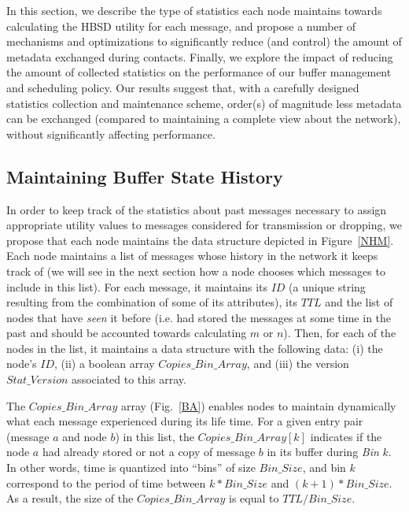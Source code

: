 In this section, we describe the type of statistics each node maintains towards calculating the HBSD utility for each message, and propose a number of mechanisms and optimizations to significantly reduce (and control) the amount of metadata exchanged during contacts. Finally, we explore the impact of reducing the amount of collected statistics on the performance of our buffer management and scheduling policy. Our results suggest that, with a carefully designed statistics collection and maintenance scheme, order(s) of magnitude less metadata can be exchanged (compared to maintaining a complete view about the network), without significantly affecting performance.

\subsection{Maintaining Buffer State History}
\label{NetworkHistoryModel}

In order to keep track of the statistics about past messages necessary to assign appropriate utility values to messages considered for transmission or dropping, we propose that each node maintains the data structure depicted in Figure~\ref{NHM}. Each node maintains a list of messages whose history in the network it keeps track of (we will see in the next section how a node chooses which messages to include in this list). For each message, it maintains its $ID$ (a unique string resulting from the combination of some of its attributes), its $TTL$ and the list of nodes that have \emph{seen} it before (i.e. had stored the messages at some time in the past and should be accounted towards calculating $m$ or $n$). Then, for each of the nodes in the list, it maintains a data structure with the following data: (i) the node's $ID$, (ii) a boolean array $Copies\_Bin\_Array$, and (iii) the version $Stat\_Version$ associated to this array.

The $Copies\_Bin\_Array$ array (Fig.~\ref{BA}) enables nodes to maintain dynamically what each message experienced during its life time. For a given entry pair (message $a$ and node $b$) in this list, the $Copies\_Bin\_Array[k]$ indicates if the node $a$ had already stored or not a copy of message $b$ in its buffer during \emph{Bin} $k$. In other words, time is quantized into ``bins'' of size $Bin\_Size$, and bin $k$ correspond to the period of time between $k*Bin\_Size$ and $(k+1)*Bin\_Size$. As a result, the size of the $Copies\_Bin\_Array$ is equal to $TTL/Bin\_Size$.


